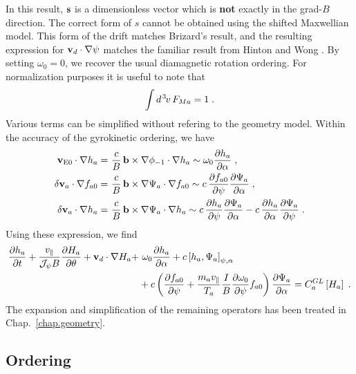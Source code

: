 %
In this result, $\mathbf{s}$ is a dimensionless vector which is 
{\bf not} exactly in the grad-$B$ direction.
The correct form of $s$ cannot be obtained using the shifted 
Maxwellian model.   This form of the drift matches Brizard's
result, and the resulting expression for $\mathbf{v}_d \cdot \nabla\psi$ 
matches the familiar result from Hinton and Wong \cite{hinton:1985}.  
By setting $\omega_0=0$, we recover the usual diamagnetic 
rotation ordering.  For normalization purposes it is useful to note that
%
\begin{equation}
\int d^{\hskip 1pt 3} \hskip -1pt v \, F_{Ma} = 1 \; .
\end{equation}
%
Various terms can be simplified without refering to the geometry 
model.  Within the accuracy of the gyrokinetic ordering, we have
%
\begin{align}
{\bf v}_{\rm E0}\cdot\nabla h_a = &~\frac{c}{B} \, \mathbf{b}\times\nabla\phi_{-1} 
 \cdot\nabla h_a 
 \sim \omega_0 \frac{\partial h_a}{\partial\alpha} \; , 
   \label{eq.vedotgradh} \\
\delta {\bf v}_a\cdot\nabla f_{a0} = &~\frac{c}{B} \, \mathbf{b}\times\nabla\Psi_a
 \cdot\nabla f_{a0} \sim c\, \frac{\partial f_{a0}}{\partial\psi}
 \frac{\partial\Psi_a}{\partial\alpha} \; ,
   \label{eq.dvdotgradf} \\
\delta {\bf v}_a\cdot\nabla h_a = &~\frac{c}{B} \, \mathbf{b}\times\nabla\Psi_a
 \cdot\nabla h_a \sim
 c\,\frac{\partial h_a}{\partial\psi}
 \frac{\partial\Psi_a}{\partial\alpha}-
 c\,\frac{\partial h_a}{\partial\alpha}
 \frac{\partial\Psi_a}{\partial\psi} \; .
   \label{eq.dvdotgradh}  
\end{align}
%
Using these expression, we find
\begin{align}
\frac{\partial h_a}{\partial t} 
+ \frac{v_\parallel}{\mathcal{J_\psi} B} \frac{\partial H_a}{\partial\theta}
+ \mathbf{v}_d \cdot\nabla H_a + &~\omega_0 \frac{\partial h_a}{\partial\alpha} 
+ c \left[ h_a,\Psi_a \right]_{\psi,\alpha} \nonumber \\
& + c \left( \frac{\partial f_{a0}}{\partial\psi} + \frac{m_a v_\parallel}{T_a} \frac{I}{B} 
\frac{\partial\omega_0}{\partial\psi} f_{a0} \right) \frac{\partial\Psi_a}{\partial\alpha} 
= C_a^{GL}\left[ H_a \right] \; .
\label{eq.gk}
\end{align}
%
The expansion and simplification of the remaining operators has been 
treated in Chap.~\ref{chap.geometry}.

\subsection{Ordering}

